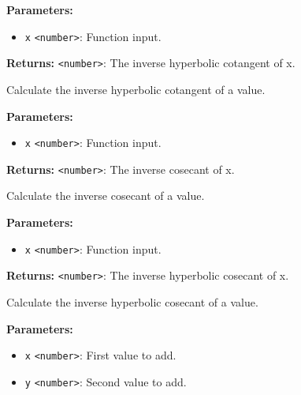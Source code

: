 \documentclass[12pt,a4paper]{article}
\begin{document}
\noindent \textbf{Parameters:}
\begin{itemize}
  \item \texttt{x} \texttt{<number>}: Function input.
\end{itemize}

\noindent \textbf{Returns:} \texttt{<number>}: The inverse hyperbolic cotangent of \textasciigrave{}x\textasciigrave{}.

\noindent Calculate the inverse hyperbolic cotangent of a value.

\vspace{5mm}
\noindent {}


\noindent \textbf{Parameters:}
\begin{itemize}
  \item \texttt{x} \texttt{<number>}: Function input.
\end{itemize}

\noindent \textbf{Returns:} \texttt{<number>}: The inverse cosecant of \textasciigrave{}x\textasciigrave{}.

\noindent Calculate the inverse cosecant of a value.

\vspace{5mm}
\noindent {}


\noindent \textbf{Parameters:}
\begin{itemize}
  \item \texttt{x} \texttt{<number>}: Function input.
\end{itemize}

\noindent \textbf{Returns:} \texttt{<number>}: The inverse hyperbolic cosecant of \textasciigrave{}x\textasciigrave{}.

\noindent Calculate the inverse hyperbolic cosecant of a value.

\vspace{5mm}
\noindent {}


\noindent \textbf{Parameters:}
\begin{itemize}
  \item \texttt{x} \texttt{<number>}: First value to add.
  \item \texttt{y} \texttt{<number>}: Second value to add.
\end{itemize}
\end{document}
